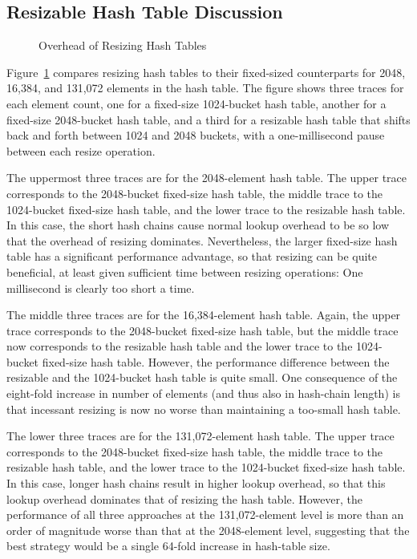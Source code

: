 \subsection{Resizable Hash Table Discussion}
\label{sec:datastruct:Resizable Hash Table Discussion}

\begin{figure}[tb]
\centering
{}
\caption{Overhead of Resizing Hash Tables}
\label{fig:datastruct:Overhead of Resizing Hash Tables}
\end{figure}

Figure~\ref{fig:datastruct:Overhead of Resizing Hash Tables}
compares resizing hash tables to their fixed-sized counterparts
for 2048, 16,384, and 131,072 elements in the hash table.
The figure shows three traces for each element count, one
for a fixed-size 1024-bucket hash table, another for a
fixed-size 2048-bucket hash table, and a third for a resizable
hash table that shifts back and forth between 1024 and 2048
buckets, with a one-millisecond pause between each resize operation.

The uppermost three traces are for the 2048-element hash table.
The upper trace corresponds to the 2048-bucket fixed-size hash
table, the middle trace to the 1024-bucket fixed-size hash table,
and the lower trace to the resizable hash table.
In this case, the short hash chains cause normal lookup overhead
to be so low that the overhead of resizing dominates.
Nevertheless, the larger fixed-size hash table has a significant
performance advantage, so that resizing can be quite beneficial,
at least given sufficient time between resizing operations: One
millisecond is clearly too short a time.

The middle three traces are for the 16,384-element hash table.
Again, the upper trace corresponds to the 2048-bucket fixed-size hash
table, but the middle trace now corresponds to the resizable hash
table and the lower trace to the 1024-bucket fixed-size hash table.
However, the performance difference between the resizable and the
1024-bucket hash table is quite small.
One consequence of the eight-fold increase in number of elements
(and thus also in hash-chain length) is that incessant resizing
is now no worse than maintaining a too-small hash table.

The lower three traces are for the 131,072-element hash table.
The upper trace corresponds to the 2048-bucket fixed-size hash table,
the middle trace to the resizable hash table, and the lower trace
to the 1024-bucket fixed-size hash table.
In this case, longer hash chains result in higher lookup overhead,
so that this lookup overhead dominates that of resizing the hash
table.
However, the performance of all three approaches at the 131,072-element
level is more than an order of magnitude worse than that at the
2048-element level, suggesting that the best strategy would be
a single 64-fold increase in hash-table size.

